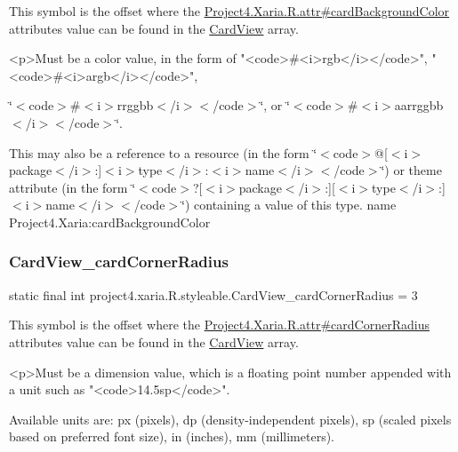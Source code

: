This symbol is the offset where the \hyperlink{}{Project4.\+Xaria.\+R.\+attr\#card\+Background\+Color} attribute\textquotesingle{}s value can be found in the \hyperlink{classproject4_1_1xaria_1_1R_1_1styleable_abef2e3d3e2b11dd786470094dbc57ea4}{Card\+View} array.

\begin{DoxyVerb}      <p>Must be a color value, in the form of "<code>#<i>rgb</i></code>", "<code>#<i>argb</i></code>",
\end{DoxyVerb}
 \char`\"{}$<$code$>$\#$<$i$>$rrggbb$<$/i$>$$<$/code$>$\char`\"{}, or \char`\"{}$<$code$>$\#$<$i$>$aarrggbb$<$/i$>$$<$/code$>$\char`\"{}. 

This may also be a reference to a resource (in the form \char`\"{}$<$code$>$@\mbox{[}$<$i$>$package$<$/i$>$\+:\mbox{]}$<$i$>$type$<$/i$>$\+:$<$i$>$name$<$/i$>$$<$/code$>$\char`\"{}) or theme attribute (in the form \char`\"{}$<$code$>$?\mbox{[}$<$i$>$package$<$/i$>$\+:\mbox{]}\mbox{[}$<$i$>$type$<$/i$>$\+:\mbox{]}$<$i$>$name$<$/i$>$$<$/code$>$\char`\"{}) containing a value of this type.  name Project4.\+Xaria\+:card\+Background\+Color \mbox{\label{classproject4_1_1xaria_1_1R_1_1styleable_af0c0306982a503b9a005aebafa2f8251}} 
\subsubsection{\texorpdfstring{Card\+View\+\_\+card\+Corner\+Radius}{CardView\_cardCornerRadius}}
{\footnotesize\ttfamily static final int project4.\+xaria.\+R.\+styleable.\+Card\+View\+\_\+card\+Corner\+Radius = 3\hspace{0.3cm}{\ttfamily [static]}}

This symbol is the offset where the \hyperlink{}{Project4.\+Xaria.\+R.\+attr\#card\+Corner\+Radius} attribute\textquotesingle{}s value can be found in the \hyperlink{classproject4_1_1xaria_1_1R_1_1styleable_abef2e3d3e2b11dd786470094dbc57ea4}{Card\+View} array.

\begin{DoxyVerb}      <p>Must be a dimension value, which is a floating point number appended with a unit such as "<code>14.5sp</code>".
\end{DoxyVerb}
 Available units are\+: px (pixels), dp (density-\/independent pixels), sp (scaled pixels based on preferred font size), in (inches), mm (millimeters). 


